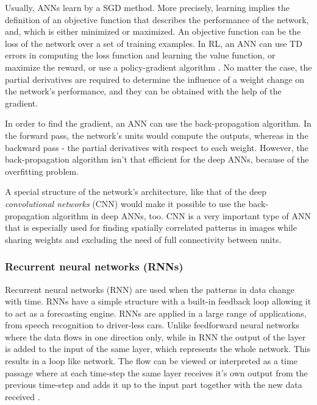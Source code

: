Usually, ANNs learn by a SGD method. More precisely, learning implies the definition of an objective function that describes the performance of the network, and, which is either minimized or maximized. An objective function can be the loss of the network over a set of training examples. In RL, an ANN can use TD errors in computing the loss function and learning the value function, or maximize the reward, or use a policy-gradient algorithm \cite{Sutton}. No matter the case, the partial derivatives are required to determine the influence of a weight change on the network's performance, and they can be obtained with the help of the gradient.

In order to find the gradient, an ANN can use the back-propagation algorithm. In the forward pass, the network's units would compute the outputs, whereas in the backward pass - the partial derivatives with respect to each weight. However, the back-propagation algorithm isn't that efficient for the deep ANNs, because of the overfitting problem.

A special structure of the network's architecture, like that of the deep \textit{convolutional networks} (CNN) would make it possible to use the back-propagation algorithm in deep ANNs, too. CNN is a very important type of ANN that is especially used for finding spatially correlated patterns in images while sharing weights and excluding the need of full connectivity between units.



\subsubsection{Recurrent neural networks (RNNs)}
Recurrent neural networks (RNN) are used when the patterns in data change with time. RNNs have a simple structure with a built-in feedback loop allowing it to act as a forecasting engine. RNNs are applied in a large range of applications, from speech recognition to driver-less cars. Unlike feedforward neural networks where the data flows in one direction only, while in RNN the output of the layer is added to the input of the same layer, which represents the whole network. This results in a loop like network. The flow can be viewed or interpreted as a time passage where at each time-step the same layer receives it's own output from the previous time-step and adds it up to the input part together with the new data received \cite{RNNvideo}. 

